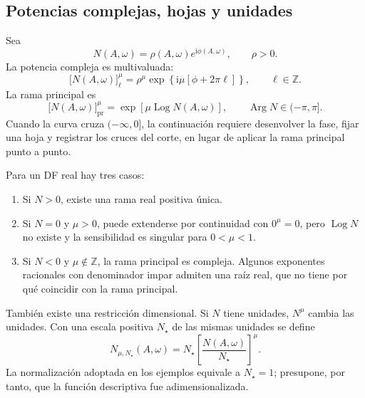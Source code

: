 \subsection{Potencias complejas, hojas y unidades}

Sea
\[
 N(A,\omega)=\rho(A,\omega)e^{\mathrm i\phi(A,\omega)},
 \qquad \rho>0.
\]
La potencia compleja es multivaluada:
\begin{equation}
 \bigl[N(A,\omega)\bigr]_{\ell}^{\mu}
 =\rho^\mu
 \exp\!\left\{\mathrm i\mu[\phi+2\pi\ell]\right\},
 \qquad \ell\in\mathbb Z.
 \label{eq:machado-multivalued}
\end{equation}
La rama principal es
\begin{equation}
 \bigl[N(A,\omega)\bigr]_{\mathrm{pr}}^{\mu}
 =\exp\!\left[\mu\operatorname{Log}N(A,\omega)\right],
 \qquad \operatorname{Arg}N\in(-\pi,\pi].
 \label{eq:machado-principal}
\end{equation}
Cuando la curva cruza \(( -\infty,0]\), la continuación requiere desenvolver la
fase, fijar una hoja y registrar los cruces del corte, en lugar de aplicar la
rama principal punto a punto.

Para un DF real hay tres casos:
\begin{enumerate}
 \item Si \(N>0\), existe una rama real positiva única.
 \item Si \(N=0\) y \(\mu>0\), puede extenderse por continuidad con
       \(0^\mu=0\), pero \(\operatorname{Log}N\) no existe y la sensibilidad
       es singular para \(0<\mu<1\).
 \item Si \(N<0\) y \(\mu\notin\mathbb Z\), la rama principal es compleja.
       Algunos exponentes racionales con denominador impar admiten una raíz
       real, que no tiene por qué coincidir con la rama principal.
\end{enumerate}

También existe una restricción dimensional. Si \(N\) tiene unidades,
\(N^\mu\) cambia las unidades. Con una escala positiva \(N_\star\) de las mismas
unidades se define
\begin{equation}
 N_{\mu,N_\star}(A,\omega)
 =N_\star\left[\frac{N(A,\omega)}{N_\star}\right]^\mu.
 \label{eq:machado-normalized}
\end{equation}
La normalización adoptada en los ejemplos equivale a \(N_\star=1\); presupone,
por tanto, que la función descriptiva fue adimensionalizada.

